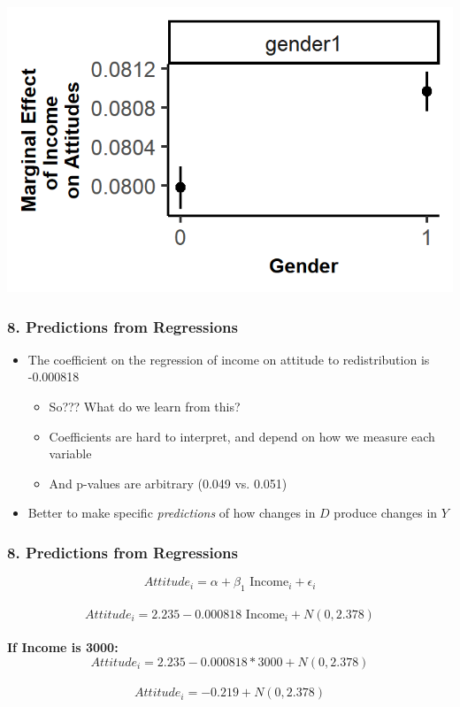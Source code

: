 \documentclass[xcolor=x11names,compress]{beamer}\usepackage[]{graphicx}\usepackage[]{color}
\makeatletter
\def\maxwidth{ %
  \ifdim\Gin@nat@width>\linewidth
    \linewidth
  \else
    \Gin@nat@width
  \fi
}
\newenvironment{knitrout}{}{} %
\renewcommand{\(}{\begin{columns}}
\renewcommand{\)}{\end{columns}}
\newcommand{\<}[1]{\begin{column}{#1}}
\renewcommand{\>}{\end{column}}
\makeatother
\begin{document}
\begin{frame}
\begin{multicols}{2}
\begin{knitrout}
\end{knitrout}
\pause
\begin{knitrout}
\color{fgcolor}
\includegraphics[width=\maxwidth]{figure/interaction_plot_3-1} 

\end{knitrout}
\end{multicols}
\end{frame}

\begin{frame}
\frametitle{8. Predictions from Regressions}
\begin{itemize}
\item The coefficient on the regression of income on attitude to redistribution is -0.000818
\begin{itemize}
\pause
\item So??? What do we learn from this?
\pause
\item Coefficients are hard to interpret, and depend on how we measure each variable
\item And p-values are arbitrary (0.049 vs. 0.051)
\end{itemize}  
\pause
\item Better to make specific \textit{predictions} of how changes in $D$ produce changes in $Y$
\end{itemize}
\end{frame}

\begin{frame}
\frametitle{8. Predictions from Regressions}
$$Attitude_i = \alpha + \beta_1 \text{ Income}_i + \epsilon_i$$ \\
\pause
$$Attitude_i = 2.235 - 0.000818 \text{ Income}_i + N(0,2.378)$$ \\
\pause
\textbf{If Income is 3000:}  \\
$$Attitude_i = 2.235-0.000818*3000 + N(0,2.378)$$ \\
$$Attitude_i = -0.219 + N(0,2.378)$$
\end{frame}
\end{document}
